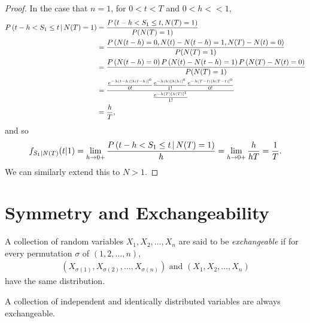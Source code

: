 \begin{proof}
    In the case that $n = 1$, for $0 < t < T$ and $0 < h << 1$,
    \begin{align*}
        P\left(t - h < S_1 \leq t \,\middle|\, N(T) = 1\right) &= \frac{P\left(t - h < S_1 \leq t, N(T) = 1\right)}{P(N(T) = 1)} \\
        &= \frac{P\left(N(t - h) = 0, N(t) - N(t-h) = 1, N(T) - N(t)= 0\right)}{P(N(T) = 1)} \\
        &= \frac{P\left(N(t - h) = 0\right)P\left(N(t) - N(t-h) = 1\right)P\left(N(T) - N(t)= 0\right)}{P(N(T) = 1)} \\
        &= \frac{\frac{e^{-\lambda(t-h)\left[\lambda(t-h)\right]^{0}}}{0!}\frac{e^{-\lambda(h)\left[\lambda(h)\right]^{0}}}{1!}\frac{e^{-\lambda(T-t)\left[\lambda(T-t)\right]^{0}}}{0!}}{\frac{e^{-\lambda(T)\left[\lambda(T)\right]^{1}}}{1!}} \\
        &= \frac{h}{T},
    \end{align*}
    and so
    \begin{align*}
        f_{S_1|N(T)}(t|1) = \lim_{h \to 0+}\frac{P\left(t - h < S_1 \leq t \,\middle|\, N(T) = 1\right)}{h} =  \lim_{h \to 0+}\frac{h}{hT} = \frac{1}{T}.
    \end{align*}
    We can similarly extend this to $N > 1$.
\end{proof}

\section{Symmetry and Exchangeability}

\begin{defn}
    A collection of random variables $X_1, X_2, \ldots, X_n$ are said to be \emph{exchangeable} if for every permutation $\sigma$ of $(1, 2, \ldots, n)$,
    \begin{align*}
        (X_{\sigma(1)}, X_{\sigma(2)}, \ldots, X_{\sigma(n)})\textrm{ and } (X_1, X_2, \ldots, X_n)
    \end{align*}
    have the same distribution.
\end{defn}

\begin{prop}
    A collection of independent and identically distributed variables are always exchangeable.
\end{prop}

